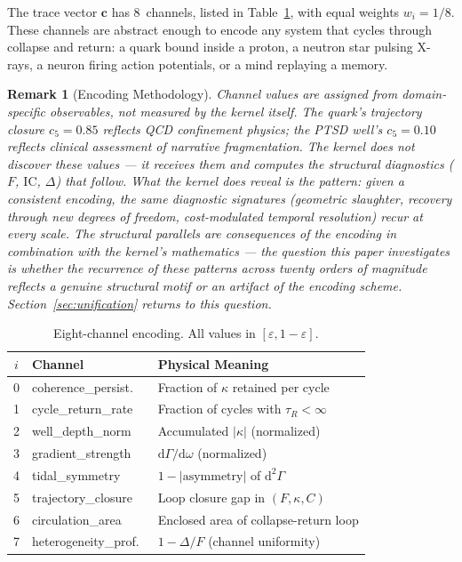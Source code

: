 \documentclass[
  aps,
  prd,
  twocolumn,
  superscriptaddress,
  nofootinbib,
  floatfix
]{revtex4-2}
\newtheorem{remark}{Remark}
\newcommand{\Gam}{\Gamma}
\newcommand{\eps}{\varepsilon}
\newcommand{\dd}{\mathrm{d}}
\newcommand{\tvec}{\mathbf{c}}
\newcommand{\IC}{\mathrm{IC}}
\begin{document}
The trace vector $\tvec$ has 8~channels, listed in
Table~\ref{tab:channels}, with equal weights $w_i = 1/8$.
These channels are abstract enough to encode any system
that cycles through collapse and return: a quark bound inside
a proton, a neutron star pulsing X-rays, a neuron firing
action potentials, or a mind replaying a memory.

\begin{remark}[Encoding Methodology]
\label{rem:encoding}
Channel values are assigned from domain-specific observables,
not measured by the kernel itself.  The quark's trajectory
closure $c_5 = 0.85$ reflects QCD confinement physics; the
PTSD well's $c_5 = 0.10$ reflects clinical assessment of
narrative fragmentation.  The kernel does not discover these
values --- it receives them and computes the structural
diagnostics ($F$, $\IC$, $\Delta$) that follow.  What the
kernel \emph{does} reveal is the \emph{pattern}: given a
consistent encoding, the same diagnostic signatures
(geometric slaughter, recovery through new degrees of
freedom, cost-modulated temporal resolution) recur at every
scale.  The structural parallels are consequences of the
encoding in combination with the kernel's mathematics ---
the question this paper investigates is whether the
recurrence of these patterns across twenty orders of
magnitude reflects a genuine structural motif or an artifact
of the encoding scheme.  Section~\ref{sec:unification}
returns to this question.
\end{remark}

\begin{table}[t]
\caption{\label{tab:channels}Eight-channel encoding.  All
values in $[\eps, 1{-}\eps]$.}
\begin{ruledtabular}
\begin{tabular}{clp{3.7cm}}
$i$ & Channel & Physical Meaning \\
\hline
0 & coherence\_persist.\ & Fraction of $\kappa$ retained per cycle \\
1 & cycle\_return\_rate & Fraction of cycles with $\tau_R < \infty$ \\
2 & well\_depth\_norm & Accumulated $|\kappa|$ (normalized) \\
3 & gradient\_strength & $\dd\Gam/\dd\omega$ (normalized) \\
4 & tidal\_symmetry & $1 - |\text{asymmetry}|$ of $\dd^2\Gam$ \\
5 & trajectory\_closure & Loop closure gap in $(F,\kappa,C)$ \\
6 & circulation\_area & Enclosed area of collapse-return loop \\
7 & heterogeneity\_prof.\ & $1 - \Delta/F$ (channel uniformity) \\
\end{tabular}
\end{ruledtabular}
\end{table}
\end{document}
